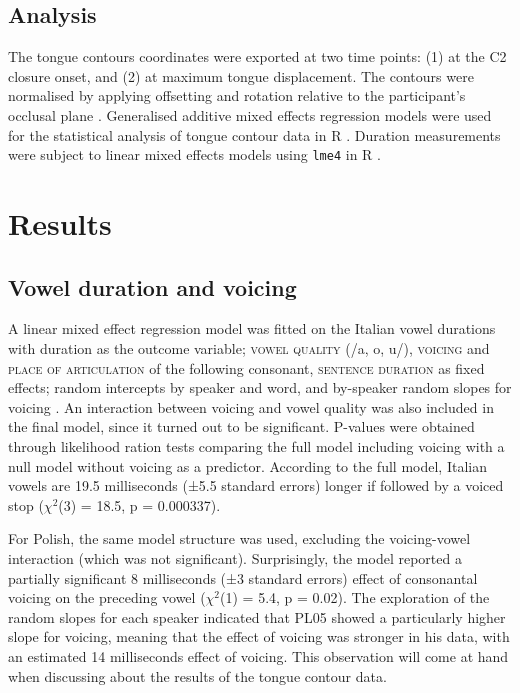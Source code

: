 \documentclass[authoryear, twocolumn]{elsarticle}
\begin{document}
\subsection{Analysis}\label{analysis}

The tongue contours coordinates were exported at two time points: (1) at
the C2 closure onset, and (2) at maximum tongue displacement. The
contours were normalised by applying offsetting and rotation relative to
the participant's occlusal plane \citep{scobbie2011}. Generalised
additive mixed effects regression models \citep{wood2006} were used for
the statistical analysis of tongue contour data in R
\citep{r-core-team2017}. Duration measurements were subject to linear
mixed effects models using \texttt{lme4} in R \citep{bates2015}.

\section{Results}\label{results}

\subsection{Vowel duration and
voicing}\label{vowel-duration-and-voicing}

A linear mixed effect regression model was fitted on the Italian vowel
durations with duration as the outcome variable; \textsc{vowel quality}
(/a, o, u/), \textsc{voicing} and \textsc{place of articulation} of the
following consonant, \textsc{sentence duration} as fixed effects; random
intercepts by speaker and word, and by-speaker random slopes for voicing
. An interaction between voicing and vowel quality was also included in
the final model, since it turned out to be significant. P-values were
obtained through likelihood ration tests comparing the full model
including voicing with a null model without voicing as a predictor.
According to the full model, Italian vowels are 19.5 milliseconds (±5.5
standard errors) longer if followed by a voiced stop (\(\chi^2\)(3) =
18.5, p = 0.000337).

For Polish, the same model structure was used, excluding the
voicing-vowel interaction (which was not significant). Surprisingly, the
model reported a partially significant 8 milliseconds (±3 standard
errors) effect of consonantal voicing on the preceding vowel
(\(\chi^2\)(1) = 5.4, p = 0.02). The exploration of the random slopes
for each speaker indicated that PL05 showed a particularly higher slope
for voicing, meaning that the effect of voicing was stronger in his
data, with an estimated 14 milliseconds effect of voicing. This
observation will come at hand when discussing about the results of the
tongue contour data.
\end{document}
